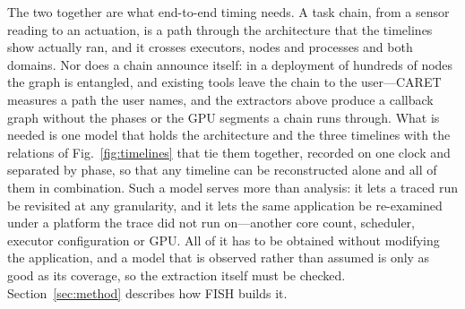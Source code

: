 The two together are what end-to-end timing needs. A task chain, from a sensor reading to an actuation, is a path through the architecture that the timelines show actually ran, and it crosses executors, nodes and processes and both domains. Nor does a chain announce itself: in a deployment of hundreds of nodes the graph is entangled, and existing tools leave the chain to the user---CARET measures a path the user names, and the extractors above produce a callback graph without the phases or the GPU segments a chain runs through. What is needed is one model that holds the architecture and the three timelines with the relations of Fig.~\ref{fig:timelines} that tie them together, recorded on one clock and separated by phase, so that any timeline can be reconstructed alone and all of them in combination. Such a model serves more than analysis: it lets a traced run be revisited at any granularity, and it lets the same application be re-examined under a platform the trace did not run on---another core count, scheduler, executor configuration or GPU. All of it has to be obtained without modifying the application, and a model that is observed rather than assumed is only as good as its coverage, so the extraction itself must be checked. Section~\ref{sec:method} describes how FISH builds it.
